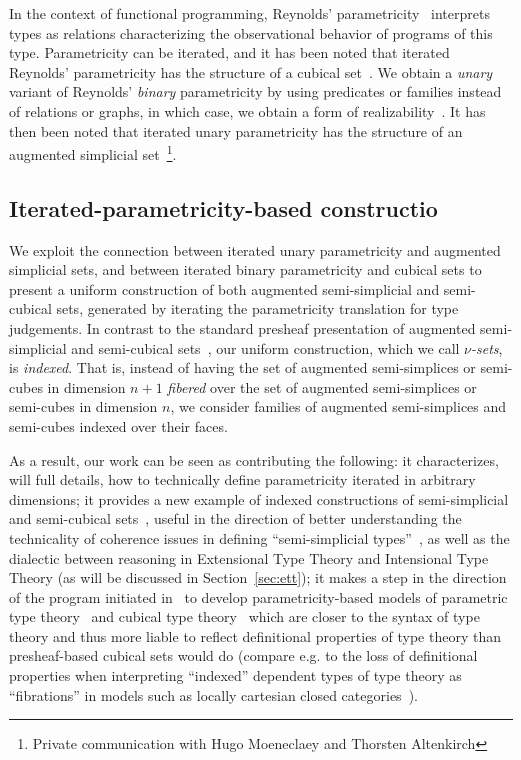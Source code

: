 \documentclass{msc}
\begin{document}
In the context of functional programming, Reynolds' parametricity~\cite{reynolds83} interprets types as relations characterizing the observational behavior of programs of this type. Parametricity can be iterated, and it has been noted that iterated Reynolds' parametricity has the structure of a cubical set~\cite{johann17,altenkirch15,moulin16,moeneclaey21,moeneclaey22phd}. We obtain a \emph{unary} variant of Reynolds' \emph{binary} parametricity by using predicates or families instead of relations or graphs, in which case, we obtain a form of realizability~\cite{bernardy12,lasson12,moulin16}. It has then been noted that iterated unary parametricity has the structure of an augmented simplicial set~\footnote{Private communication with Hugo Moeneclaey and Thorsten Altenkirch}.

\subsection{Iterated-parametricity-based constructio}

We exploit the connection between iterated unary parametricity and augmented simplicial sets, and between iterated binary parametricity and cubical sets to present a uniform construction of both augmented semi-simplicial and semi-cubical sets, generated by iterating the parametricity translation for type judgements. In contrast to the standard presheaf presentation of augmented semi-simplicial and semi-cubical sets~\cite{fri08,grandis03,buchholtz17}, our uniform construction, which we call \emph{$\nu$-sets}, is \emph{indexed}. That is, instead of having the set of augmented semi-simplices or semi-cubes in dimension $n+1$ \emph{fibered} over the set of augmented semi-simplices or semi-cubes in dimension $n$, we consider families of augmented semi-simplices and semi-cubes indexed over their faces.

As a result, our work can be seen as contributing the following: it characterizes, will full details, how to technically define parametricity iterated in arbitrary dimensions; %
it provides a new example of indexed constructions of semi-simplicial and semi-cubical sets~\cite{voevodsky12,herbelin15,part15}, useful in the direction of better understanding the technicality of coherence issues in defining ``semi-simplicial types''~\cite{part15,shulman14,altenkirch16,kraus2017space}, as well as the dialectic between reasoning in Extensional Type Theory and Intensional Type Theory (as will be discussed in Section~\ref{sec:ett}); it makes a step in the direction of the program initiated in~\cite{altenkirch15} to develop parametricity-based models of parametric type theory~\cite{bernardy15,nuyts17,cavallo19} and cubical type theory~\cite{bezem13,cohen16,angiuli21} which are closer to the syntax of type theory and thus more liable to reflect definitional properties of type theory than presheaf-based cubical sets would do (compare e.g. to the loss of definitional properties when interpreting ``indexed'' dependent types of type theory as ``fibrations'' in models such as locally cartesian closed categories~\cite{curien14}).
\end{document}
